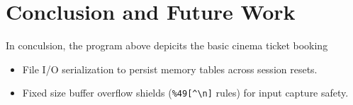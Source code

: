 \documentclass[12pt,a4paper]{article}
\begin{document}
\section{Conclusion and Future Work}
In conculsion, the program above depicits the basic cinema ticket booking
\begin{itemize}
    \item File I/O serialization to persist memory tables across session resets.
    \item Fixed size buffer overflow shields (\texttt{\%49[\^{}\textbackslash n]} rules) for input capture safety.
\end{itemize}
\end{document}

